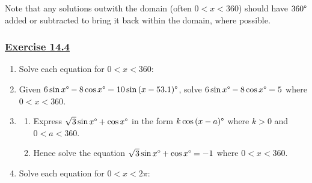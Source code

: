 \documentclass[
  11pt,
  openany]{book}
\begin{document}
Note that any solutions outwith the domain (often \(0<x<360\)) should have \(360\degree\) added or subtracted to bring it back within the domain, where possible.

\vspace{-0.5cm}

\label{ex144q}{}

\subsubsection*{\texorpdfstring{\hyperref[ex144a]{Exercise 14.4}}{Exercise 14.4}}\label{exercise-14.4}

\vspace{-0.3cm}

\begin{enumerate}
    \item Solve each equation for $0<x<360$: \faCalculator
    \vspace{-0.2cm}
    \begin{enumerate}
    \end{enumerate}
    \item Given $6\sin{x}\degree-8\cos{x}\degree=10\sin{(x-53.1)}\degree$, solve $6\sin{x}\degree-8\cos{x}\degree=5$ where $0<x<360$.
    \item 
    \begin{enumerate}
        \item Express $\sqrt{3}\sin{x}\degree+\cos{x}\degree$ in the form $k\cos{(x-a)}\degree$ where $k>0$ and $0<a<360$. 
        \item Hence solve the equation $\sqrt{3}\sin{x}\degree+\cos{x}\degree=-1$ where $0<x<360$.
    \end{enumerate}
    \item Solve each equation for $0<x<2\pi$: \faCalculator
    \vspace{-0.2cm}
    \begin{enumerate}
\end{enumerate}
\end{enumerate}
\end{document}

